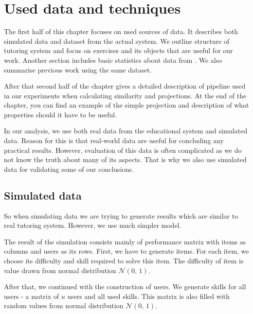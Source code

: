 \documentclass[
  digital, %
  table,   %
  nolof,     %
  nolot,     %
  nocover
]{fithesis3}
\begin{document}
\chapter{Used data and techniques}\label{used-data-and-techniques}


The first half of this chapter focuses on used sources of data. It describes both simulated data and dataset from the actual system.
We outline structure of tutoring system and focus on exercises and its objects that are useful for our work. Another section includes basic statistics about data from \umimeCesky{}. We also summarise previous work using the same dataset.

After that second half of the chapter gives a detailed description of pipeline used in our experiments when calculating similarity and projections. At the end of the chapter, you can find an example of the simple projection and description of what properties should it have to be useful.


In our analysis, we use both real data from the educational system and simulated data. Reason for this is that real-world data are useful for concluding any practical results. However, evaluation of this data is often complicated as we do not know the truth about many of its aspects. That is why we also use simulated data for validating some of our conclusions.


\section{Simulated data}\label{simulated-data}

So when simulating data we are trying to generate results which are similar to real tutoring system. However, we use much simpler model.

The result of the simulation consists mainly of performance matrix with items as columns and users as its rows. First, we have to generate items. For each item, we choose its difficulty and skill required to solve this item. The difficulty of item is value drawn from normal distribution $\mathcal{N}(0,\,1)$.

After that, we continued with the construction of users. We generate skills for all users - a matrix of $u$ users and all used skills. This matrix is also filled with random values from normal distribution $\mathcal{N}(0,\,1)$.
\end{document}
